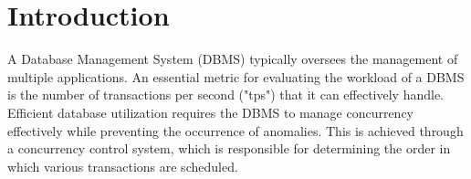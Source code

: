 \section{Introduction}

A Database Management System (DBMS) typically oversees the management of multiple applications.
An essential metric for evaluating the workload of a DBMS is the number of transactions per second ("tps") that it can effectively handle. 
Efficient database utilization requires the DBMS to manage concurrency effectively while preventing the occurrence of anomalies. 
This is achieved through a concurrency control system, which is responsible for determining the order in which various transactions are scheduled.